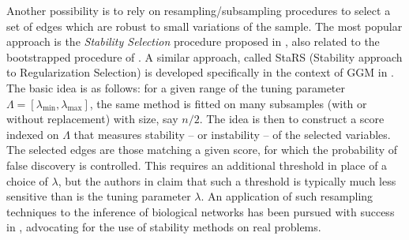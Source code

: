 Another possibility is to rely on resampling/subsampling procedures to
select a  set of  edges which  are robust to  small variations  of the
sample.  The  most popular approach is  the \emph{Stability Selection}
procedure  proposed in  \cite{2010_JRSS_Meinshausen}, also  related to
the  bootstrapped  procedure  of  \cite{bach2008bolasso}.   A  similar
approach,   called  StaRS   (Stability   approach  to   Regularization
Selection)  is  developed  specifically  in  the  context  of  GGM  in
\cite{liu2010stability}. The  basic idea  is as  follows: for  a given
range       of       the        tuning       parameter       $\Lambda=
[\lambda_{\textrm{min}},\lambda_{\textrm{max}}]$,  the same  method is
fitted on many subsamples (with or without replacement) with size, say
$n/2$. The idea is then to construct a score indexed on $\Lambda$ that
measures stability -- or instability -- of the selected variables. The
selected  edges  are those  matching  a  given  score, for  which  the
probability  of  false  discovery  is controlled.   This  requires  an
additional  threshold in  place  of  a choice  of  $\lambda$, but  the
authors  in  \cite{2010_JRSS_Meinshausen,liu2010stability} claim  that
such a threshold  is typically much less sensitive than  is the tuning
parameter $\lambda$.  An application  of such resampling techniques to
the inference of biological networks  has been pursued with success in
\cite{haury2012tigress}, advocating  for the use of  stability methods
on real problems.



